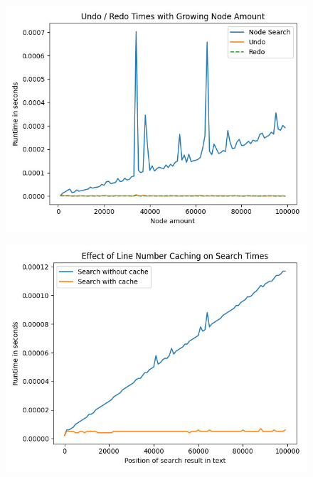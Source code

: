 \begin{minipage}[t]{0.48\textwidth}
\centering
\begin{figure}[H]
\centering
\includegraphics[width=\textwidth]{./images/Profiler-Undo-Redo.jpg}
\caption{ }
\label{fig:undoMetric}
\end{figure}
\end{minipage}
\hfill
\begin{minipage}[t]{0.48\textwidth}
\centering
\begin{figure}[H]
\centering
\includegraphics[width=\textwidth]{./images/Profiler-Find-Caching.jpg}
\caption{ }
\label{fig:findMetric}
\end{figure}
\end{minipage}

